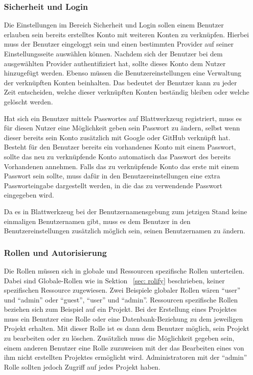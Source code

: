 \subsubsection{Sicherheit und Login}
Die Einstellungen im Bereich Sicherheit und Login sollen einem Benutzer erlauben sein bereits erstelltes Konto mit weiteren Konten zu verknüpfen. Hierbei muss der Benutzer eingeloggt sein und einen bestimmten Provider auf seiner Einstellungsseite auswählen können. Nachdem sich der Benutzer bei dem ausgewählten Provider authentifiziert hat, sollte dieses Konto dem Nutzer hinzugefügt werden. Ebenso müssen die Benutzereinstellungen eine Verwaltung der verknüpften Konten beinhalten. Das bedeutet der Benutzer kann zu jeder Zeit entscheiden, welche dieser verknüpften Konten beständig bleiben oder welche gelöscht werden.

Hat sich ein Benutzer mittels Passwortes auf Blattwerkzeug registriert, muss es für diesen Nutzer eine Möglichkeit geben sein Passwort zu ändern, selbst wenn dieser bereits sein Konto zusätzlich mit Google oder GitHub verknüpft hat. Besteht für den Benutzer bereits ein vorhandenes Konto mit einem Passwort, sollte das neu zu verknüpfende Konto automatisch das Passwort des bereits Vorhandenen annehmen. Falls das zu verknüpfende Konto das erste mit einem Passwort sein sollte, muss dafür in den Benutzereinstellungen eine extra Passworteingabe dargestellt werden, in die das zu verwendende Passwort eingegeben wird.

Da es in Blattwerkzeug bei der Benutzernamensgebung zum jetzigen Stand keine einmaligen Benutzernamen gibt, muss es dem Benutzer in den Benutzereinstellungen zusätzlich möglich sein, seinen Benutzernamen zu ändern.

\subsubsection{Rollen und Autorisierung}
Die Rollen müssen sich in globale und Ressourcen spezifische Rollen unterteilen. Dabei sind Globale-Rollen wie in Sektion ~\ref{sec: rolify} beschrieben, keiner spezifischen Ressource zugewiesen. Zwei Beispiele globaler Rollen wären \enquote{user} und \enquote{admin} oder \enquote{guest}, \enquote{user} und \enquote{admin}. Ressourcen spezifische Rollen beziehen sich zum Beispiel auf ein Projekt. Bei der Erstellung eines Projektes muss ein Benutzer eine Rolle oder eine Datenbank-Beziehung zu dem jeweiligen Projekt erhalten. Mit dieser Rolle ist es dann dem Benutzer möglich, sein Projekt zu bearbeiten oder zu löschen. Zusätzlich muss die Möglichkeit gegeben sein, einem anderen Benutzer eine Rolle zuzuweisen mit der das Bearbeiten eines von ihm nicht erstellten Projektes ermöglicht wird. Administratoren mit der \enquote{admin} Rolle sollten jedoch Zugriff auf jedes Projekt haben.


